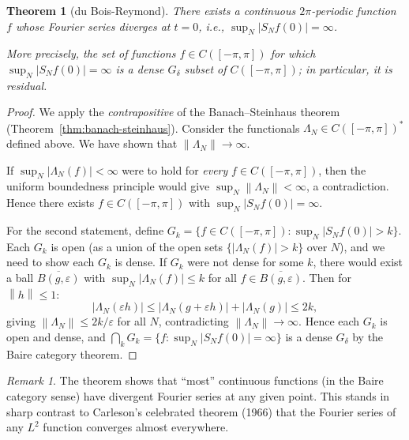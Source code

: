 \documentclass[a4paper,12pt]{book}
\newcommand{\norm}[1]{\left\| #1 \right\|}
\newcommand{\abs}[1]{\left| #1 \right|}
\theoremstyle{definition}
\theoremstyle{plain}
\newtheorem{theorem}[definition]{Theorem}
\theoremstyle{remark}
\newtheorem{remark}[definition]{Remark}
\begin{document}
\begin{theorem}[du Bois-Reymond]\label{thm:dubois-reymond}
There exists a continuous $2\pi$-periodic function $f$ whose Fourier series
diverges at $t = 0$, i.e., $\sup_N \abs{S_N f(0)} = \infty$.

More precisely, the set of functions $f \in C([-\pi,\pi])$ for which
$\sup_N \abs{S_N f(0)} = \infty$ is a dense $G_\delta$ subset of
$C([-\pi,\pi])$; in particular, it is residual.
\end{theorem}

\begin{proof}
We apply the \emph{contrapositive} of the Banach--Steinhaus theorem
(Theorem~\ref{thm:banach-steinhaus}). Consider the functionals
$\Lambda_N \in C([-\pi,\pi])^*$ defined above. We have shown that
$\norm{\Lambda_N} \to \infty$.

If $\sup_N \abs{\Lambda_N(f)} < \infty$ were to hold for \emph{every}
$f \in C([-\pi,\pi])$, then the uniform boundedness principle would give
$\sup_N \norm{\Lambda_N} < \infty$, a contradiction. Hence there exists
$f \in C([-\pi,\pi])$ with $\sup_N \abs{S_N f(0)} = \infty$.

For the second statement, define $G_k = \{f \in C([-\pi,\pi]) :
\sup_N \abs{S_N f(0)} > k\}$. Each $G_k$ is open (as a union of the open sets
$\{\abs{\Lambda_N(f)} > k\}$ over $N$), and we need to show each $G_k$ is dense.
If $G_k$ were not dense for some $k$, there would exist a ball
$\overline{B(g,\varepsilon)}$ with $\sup_N \abs{\Lambda_N(f)} \leq k$ for all
$f \in \overline{B(g,\varepsilon)}$. Then for $\norm{h} \leq 1$:
\[
  \abs{\Lambda_N(\varepsilon h)} \leq \abs{\Lambda_N(g + \varepsilon h)}
  + \abs{\Lambda_N(g)} \leq 2k,
\]
giving $\norm{\Lambda_N} \leq 2k/\varepsilon$ for all $N$, contradicting
$\norm{\Lambda_N} \to \infty$. Hence each $G_k$ is open and dense, and
$\bigcap_k G_k = \{f : \sup_N \abs{S_N f(0)} = \infty\}$ is a dense $G_\delta$
by the Baire category theorem.
\end{proof}

\begin{remark}\label{rem:dubois-reymond-generic}
The theorem shows that ``most'' continuous functions (in the Baire category sense)
have divergent Fourier series at any given point. This stands in sharp contrast to
Carleson's celebrated theorem (1966) that the Fourier
series of any $L^2$ function converges almost everywhere.
\end{remark}
\end{document}
